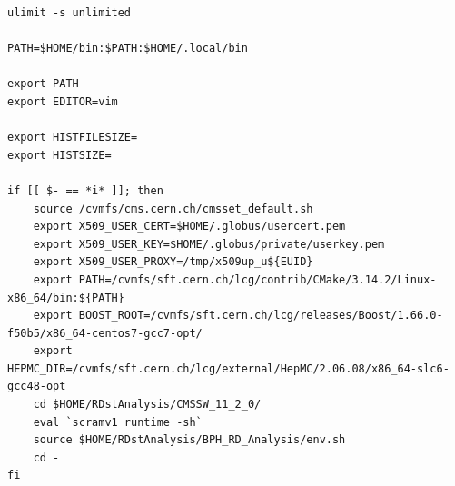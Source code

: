 \documentclass[12pt]{report}
\begin{document}
\begin{mdframed}[backgroundcolor=light-gray, roundcorner=10pt,leftmargin=1, rightmargin=1, innerleftmargin=15, innertopmargin=15,innerbottommargin=15, outerlinewidth=1, linecolor=light-gray,roundcorner=20pt]
\begin{lstlisting}
ulimit -s unlimited

PATH=$HOME/bin:$PATH:$HOME/.local/bin

export PATH
export EDITOR=vim

export HISTFILESIZE=
export HISTSIZE=

if [[ $- == *i* ]]; then
    source /cvmfs/cms.cern.ch/cmsset_default.sh
    export X509_USER_CERT=$HOME/.globus/usercert.pem
    export X509_USER_KEY=$HOME/.globus/private/userkey.pem
    export X509_USER_PROXY=/tmp/x509up_u${EUID}
    export PATH=/cvmfs/sft.cern.ch/lcg/contrib/CMake/3.14.2/Linux-x86_64/bin:${PATH}
    export BOOST_ROOT=/cvmfs/sft.cern.ch/lcg/releases/Boost/1.66.0-f50b5/x86_64-centos7-gcc7-opt/
    export HEPMC_DIR=/cvmfs/sft.cern.ch/lcg/external/HepMC/2.06.08/x86_64-slc6-gcc48-opt
    cd $HOME/RDstAnalysis/CMSSW_11_2_0/
    eval `scramv1 runtime -sh`
    source $HOME/RDstAnalysis/BPH_RD_Analysis/env.sh
    cd -
fi

\end{lstlisting}
\end{mdframed}
\end{document}

